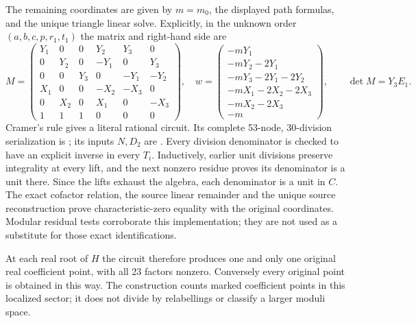 \documentclass[11pt,a4paper]{article}
\theoremstyle{remark}\newtheorem{remark}[theorem]{Remark}
\begin{document}
The remaining coordinates are given by $m=m_0$, the displayed path
formulas, and the unique triangle linear solve. Explicitly, in the
unknown order $(a,b,c,p,r_1,t_1)$ the matrix and right-hand side are
\[
 M=\begin{pmatrix}
 Y_1&0&0&Y_2&Y_3&0\\
 0&Y_2&0&-Y_1&0&Y_3\\
 0&0&Y_3&0&-Y_1&-Y_2\\
 X_1&0&0&-X_2&-X_3&0\\
 0&X_2&0&X_1&0&-X_3\\
 1&1&1&0&0&0
 \end{pmatrix},\quad
 w=\begin{pmatrix}
 -mY_1\\-mY_2-2Y_1\\-mY_3-2Y_1-2Y_2\\
 -mX_1-2X_2-2X_3\\-mX_2-2X_3\\-m
 \end{pmatrix},\qquad \det M=Y_3E_1.
\]
Cramer's rule gives a literal rational circuit. Its complete 53-node,
30-division serialization is ; its inputs
$N,D_2$ are . Every division denominator
is checked to have an explicit inverse in every $T_i$. Inductively,
earlier unit divisions preserve integrality at every lift, and the
next nonzero residue proves its denominator is a unit there. Since
the lifts exhaust the algebra, each denominator is a unit in $C$.
The exact cofactor relation, the source linear remainder and the unique
source reconstruction prove characteristic-zero equality with the
original coordinates. Modular residual tests corroborate this
implementation; they are not used as a substitute for those exact
identifications.

At each real root of $H$ the circuit therefore produces one and only
one original real coefficient point, with all 23 factors nonzero.
Conversely every original point is obtained in this way. The
construction counts marked coefficient points in this localized
sector; it does not divide by relabellings or classify a larger moduli
space.
\end{document}
